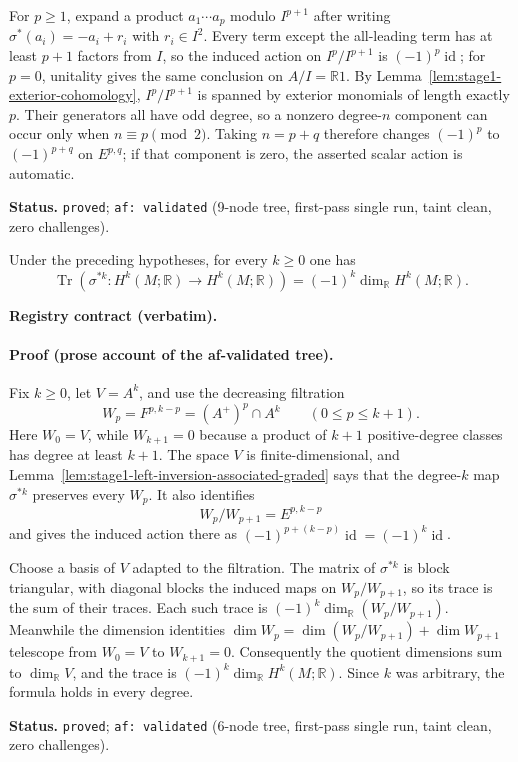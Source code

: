 For $p\ge1$, expand a product $a_1\cdots a_p$ modulo $I^{p+1}$ after writing
$\sigma^*(a_i)=-a_i+r_i$ with $r_i\in I^2$.  Every term except the all-leading term has
at least $p+1$ factors from $I$, so the induced action on $I^p/I^{p+1}$ is
$(-1)^p\operatorname{id}$; for $p=0$, unitality gives the same conclusion on
$A/I=\mathbb R1$.  By Lemma~\ref{lem:stage1-exterior-cohomology}, $I^p/I^{p+1}$ is
spanned by exterior monomials of length exactly $p$.  Their generators all have odd
degree, so a nonzero degree-$n$ component can occur only when $n\equiv p\pmod2$.
Taking $n=p+q$ therefore changes $(-1)^p$ to $(-1)^{p+q}$ on $E^{p,q}$; if that
component is zero, the asserted scalar action is automatic.

\medskip
\noindent\textbf{Status.} \texttt{proved}; \texttt{af: validated} (9-node tree,
first-pass single run, taint clean, zero challenges).

\begin{lemma}\label{lem:stage1-left-inversion-trace}
Under the preceding hypotheses, for every $k\ge0$ one has
\[
 \operatorname{Tr}\!\left(\sigma^{*k}:H^k(M;\mathbb R)\to H^k(M;\mathbb R)\right)
 =(-1)^k\dim_{\mathbb R}H^k(M;\mathbb R).
\]
\end{lemma}

\noindent\textbf{Registry contract (verbatim).}

\paragraph{Proof (prose account of the af-validated tree).}
Fix $k\ge0$, let $V=A^k$, and use the decreasing filtration
\[
 W_p=F^{p,k-p}=(A^+)^p\cap A^k\qquad(0\le p\le k+1).
\]
Here $W_0=V$, while $W_{k+1}=0$ because a product of $k+1$ positive-degree classes has
degree at least $k+1$.  The space $V$ is finite-dimensional, and
Lemma~\ref{lem:stage1-left-inversion-associated-graded} says that the degree-$k$ map
$\sigma^{*k}$ preserves every $W_p$.  It also identifies
\[
 W_p/W_{p+1}=E^{p,k-p}
\]
and gives the induced action there as
$(-1)^{p+(k-p)}\operatorname{id}=(-1)^k\operatorname{id}$.

Choose a basis of $V$ adapted to the filtration.  The matrix of $\sigma^{*k}$ is block
triangular, with diagonal blocks the induced maps on $W_p/W_{p+1}$, so its trace is the
sum of their traces.  Each such trace is
$(-1)^k\dim_{\mathbb R}(W_p/W_{p+1})$.  Meanwhile the dimension identities
$\dim W_p=\dim(W_p/W_{p+1})+\dim W_{p+1}$ telescope from $W_0=V$ to $W_{k+1}=0$.
Consequently the quotient dimensions sum to $\dim_{\mathbb R}V$, and the trace is
$(-1)^k\dim_{\mathbb R}H^k(M;\mathbb R)$.  Since $k$ was arbitrary, the formula holds
in every degree.

\medskip
\noindent\textbf{Status.} \texttt{proved}; \texttt{af: validated} (6-node tree,
first-pass single run, taint clean, zero challenges).
